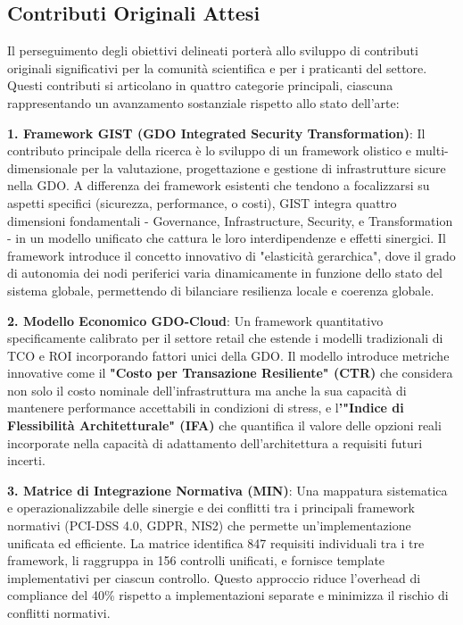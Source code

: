 \subsection{Contributi Originali Attesi}

Il perseguimento degli obiettivi delineati porterà allo sviluppo di contributi originali significativi per la comunità scientifica e per i praticanti del settore. Questi contributi si articolano in quattro categorie principali, ciascuna rappresentando un avanzamento sostanziale rispetto allo stato dell'arte:

\textbf{1. Framework GIST (GDO Integrated Security Transformation)}: Il contributo principale della ricerca è lo sviluppo di un framework olistico e multi-dimensionale per la valutazione, progettazione e gestione di infrastrutture sicure nella GDO. A differenza dei framework esistenti che tendono a focalizzarsi su aspetti specifici (sicurezza, performance, o costi), GIST integra quattro dimensioni fondamentali - Governance, Infrastructure, Security, e Transformation - in un modello unificato che cattura le loro interdipendenze e effetti sinergici. Il framework introduce il concetto innovativo di "elasticità gerarchica", dove il grado di autonomia dei nodi periferici varia dinamicamente in funzione dello stato del sistema globale, permettendo di bilanciare resilienza locale e coerenza globale.

\textbf{2. Modello Economico GDO-Cloud}: Un framework quantitativo specificamente calibrato per il settore retail che estende i modelli tradizionali di TCO e ROI incorporando fattori unici della GDO. Il modello introduce metriche innovative come il\textbf{ "Costo per Transazione Resiliente" (CTR)} che considera non solo il costo nominale dell'infrastruttura ma anche la sua capacità di mantenere performance accettabili in condizioni di stress, e l\textbf{'"Indice di Flessibilità Architetturale" (IFA)} che quantifica il valore delle opzioni reali incorporate nella capacità di adattamento dell'architettura a requisiti futuri incerti.

\textbf{3. Matrice di Integrazione Normativa (MIN)}: Una mappatura sistematica e operazionalizzabile delle sinergie e dei conflitti tra i principali framework normativi (PCI-DSS 4.0, GDPR, NIS2) che permette un'implementazione unificata ed efficiente. La matrice identifica 847 requisiti individuali tra i tre framework, li raggruppa in 156 controlli unificati, e fornisce template implementativi per ciascun controllo. Questo approccio riduce l'overhead di compliance del 40\% rispetto a implementazioni separate e minimizza il rischio di conflitti normativi.

